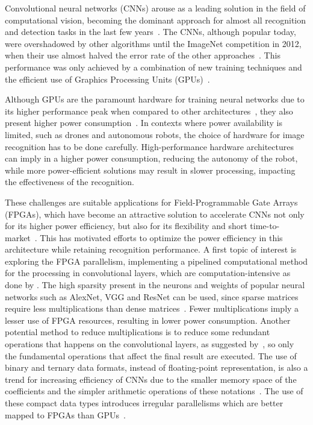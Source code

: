 \documentclass[
    12pt,                       %
    oneside,                    %
    a4paper,                    %
    brazil,                     %
    french,                     %
    spanish,                    %
    english,                    %
    ]{abntex2}
\begin{document}
Convolutional neural networks (CNNs) arouse as a leading solution in the field of computational vision, becoming the dominant approach for almost all recognition and detection tasks in the last few years~\cite{LeCun2015}. The CNNs, although popular today, were overshadowed by other algorithms until the ImageNet competition in 2012, when their use almost halved the error rate of the other approaches~\cite{NIPS2012_4824}. This performance was only achieved by a combination of new training techniques and the efficient use of Graphics Processing Units (GPUs)~\cite{LeCun2015}.

Although GPUs are the paramount hardware for training neural networks due to its higher performance peak when compared to other architectures~\cite{Zhang2017, Nurvitadhi2017_1}, they also present higher power consumption~\cite{Sun2017}. In contexts where power availability is limited, such as drones and autonomous robots, the choice of hardware for image recognition has to be done carefully. High-performance hardware architectures can imply in a higher power consumption, reducing the autonomy of the robot, while more power-efficient solutions may result in slower processing, impacting the effectiveness of the recognition.

These challenges are suitable applications for Field-Programmable Gate Arrays (FPGAs), which have become an attractive solution to accelerate CNNs not only for its higher power efficiency, but also for its flexibility and short time-to-market~\cite{Zhang2017}. This has motivated efforts to optimize the power efficiency in this architecture while retaining recognition performance. A first topic of interest is exploring the FPGA parallelism, implementing a pipelined computational method for the processing in convolutional layers, which are computation-intensive as done by \textcite{Sun2017}. The high sparsity present in the neurons and weights of popular neural networks such as AlexNet, VGG and ResNet can be used, since sparse matrices require less multiplications than dense matrices~\cite{Nurvitadhi2017_1}. Fewer multiplications imply a lesser use of FPGA resources, resulting in lower power consumption. Another potential method to reduce multiplications is to reduce some redundant operations that happens on the convolutional layers, as suggested  by~\textcite{Ujiie2016}, so only the fundamental operations that affect the final result are executed. The use of binary and ternary data formats, instead of floating-point representation, is also a trend for increasing efficiency of CNNs due to the smaller memory space of the coefficients and the simpler arithmetic operations of these notations~\cite{Courbariaux2016c, NIPS2016_6573, Venkatesh2017}. The use of these compact data types introduces irregular parallelisms which are better mapped to FPGAs than GPUs~\cite{Nurvitadhi2017_1}.
\end{document}
